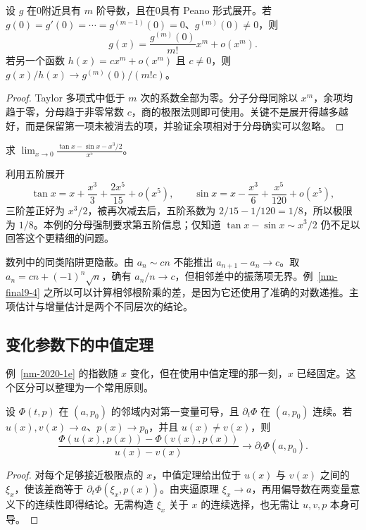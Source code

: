 \documentclass[UTF8,12pt,a4paper,fontset=fandol]{ctexart}
\begin{document}
\begin{proposition}\label{supp-taylor}
设 $g$ 在0附近具有 $m$ 阶导数，且在0具有 Peano 形式展开。若 $g(0)=g'(0)=\cdots=g^{(m-1)}(0)=0$、$g^{(m)}(0)\ne0$，则
\[
 g(x)=\frac{g^{(m)}(0)}{m!}x^m+o(x^m).
\]
若另一个函数 $h(x)=cx^m+o(x^m)$ 且 $c\ne0$，则 $g(x)/h(x)\to g^{(m)}(0)/(m!c)$。
\end{proposition}
\begin{proof}
Taylor 多项式中低于 $m$ 次的系数全部为零。分子分母同除以 $x^m$，余项均趋于零，分母趋于非零常数 $c$，商的极限法则即可使用。关键不是展开得越多越好，而是保留第一项未被消去的项，并验证余项相对于分母确实可以忽略。
\end{proof}

\begin{example}
求 $\displaystyle\lim_{x\to0}\frac{\tan x-\sin x-x^3/2}{x^5}$。
\end{example}
\begin{solve}
利用五阶展开
\[
 \tan x=x+\frac{x^3}{3}+\frac{2x^5}{15}+o(x^5),\qquad
 \sin x=x-\frac{x^3}{6}+\frac{x^5}{120}+o(x^5),
\]
三阶差正好为 $x^3/2$，被再次减去后，五阶系数为 $2/15-1/120=1/8$，所以极限为 $1/8$。本例的分母强制要求第五阶信息；仅知道 $\tan x-\sin x\sim x^3/2$ 仍不足以回答这个更精细的问题。
\end{solve}

数列中的同类陷阱更隐蔽。由 $a_n\sim cn$ 不能推出 $a_{n+1}-a_n\to c$。取 $a_n=cn+(-1)^n\sqrt n$，确有 $a_n/n\to c$，但相邻差中的振荡项无界。例~\ref{nm-final9-4} 之所以可以计算相邻根阶乘的差，是因为它还使用了准确的对数递推。主项估计与增量估计是两个不同层次的结论。

\subsection{变化参数下的中值定理}
例~\ref{nm-2020-1e} 的指数随 $x$ 变化，但在使用中值定理的那一刻，$x$ 已经固定。这个区分可以整理为一个常用原则。

\begin{proposition}[带参数差商]\label{supp-param-mvt}
设 $\Phi(t,p)$ 在 $(a,p_0)$ 的邻域内对第一变量可导，且 $\partial_t\Phi$ 在 $(a,p_0)$ 连续。若 $u(x),v(x)\to a$、$p(x)\to p_0$，并且 $u(x)\ne v(x)$，则
\[
 \frac{\Phi(u(x),p(x))-\Phi(v(x),p(x))}{u(x)-v(x)}
 \longrightarrow\partial_t\Phi(a,p_0).
\]
\end{proposition}
\begin{proof}
对每个足够接近极限点的 $x$，中值定理给出位于 $u(x)$ 与 $v(x)$ 之间的 $\xi_x$，使该差商等于 $\partial_t\Phi(\xi_x,p(x))$。由夹逼原理 $\xi_x\to a$，再用偏导数在两变量意义下的连续性即得结论。无需构造 $\xi_x$ 关于 $x$ 的连续选择，也无需让 $u,v,p$ 本身可导。
\end{proof}
\end{document}
